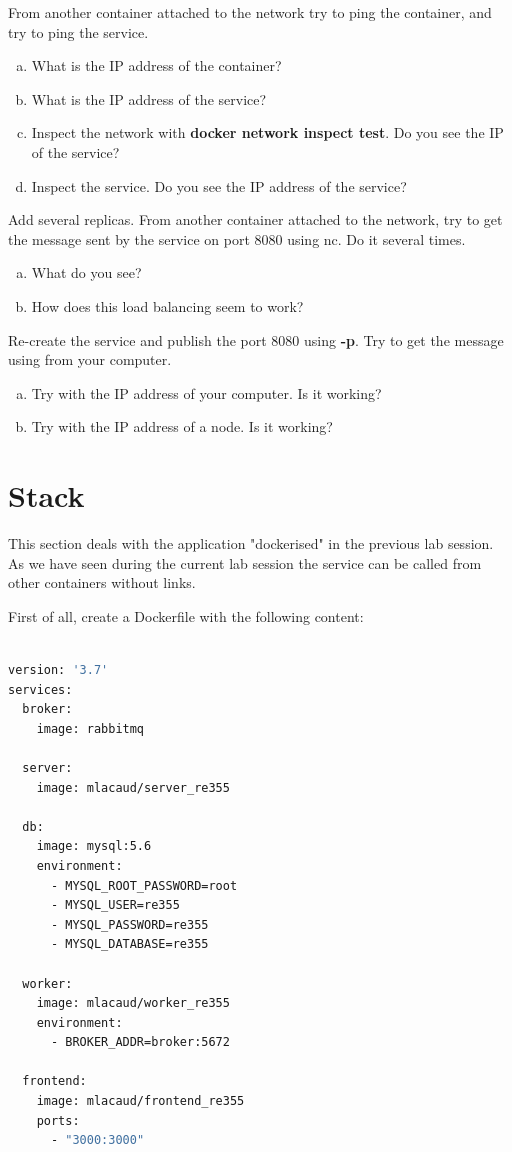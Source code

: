 \documentclass[a4paper,11pt]{exam}
\begin{document}
\begin{questions}
	\question From another container attached to the network try to ping the container, and try to ping the service.
	\begin{enumerate}[(a)]
		\item What is the IP address of the container?
		\item What is the IP address of the service?
		\item Inspect the network with \textbf{docker network inspect test}. Do you see the IP of the service?
		\item Inspect the service. Do you see the IP address of the service?
	\end{enumerate}

	\question Add several replicas. From another container attached to the network, try to get the message sent by the service on port 8080 using nc. Do it several times.
	\begin{enumerate}[(a)]
		\item What do you see?
		\item How does this load balancing seem to work?
	\end{enumerate}

	\question Re-create the service and publish the port 8080 using \textbf{-p}. Try to get the message using from your computer.
	\begin{enumerate}[(a)]
		\item Try with the IP address of your computer. Is it working?
		\item Try with the IP address of a node. Is it working?
	\end{enumerate}
\end{questions}


\section{Stack}

This section deals with the application "dockerised" in the previous lab session. As we have seen during the current lab session the service can be called from other containers without links.

First of all, create a Dockerfile with the following content:


\begin{lstlisting}[frame=single,language={sh}]  % Start your code-block

version: '3.7'
services:
  broker:
    image: rabbitmq

  server:
    image: mlacaud/server_re355

  db:
    image: mysql:5.6
    environment:
      - MYSQL_ROOT_PASSWORD=root
      - MYSQL_USER=re355
      - MYSQL_PASSWORD=re355
      - MYSQL_DATABASE=re355

  worker:
    image: mlacaud/worker_re355
    environment:
      - BROKER_ADDR=broker:5672

  frontend:
    image: mlacaud/frontend_re355
    ports:
      - "3000:3000"
\end{lstlisting}
\end{document}
